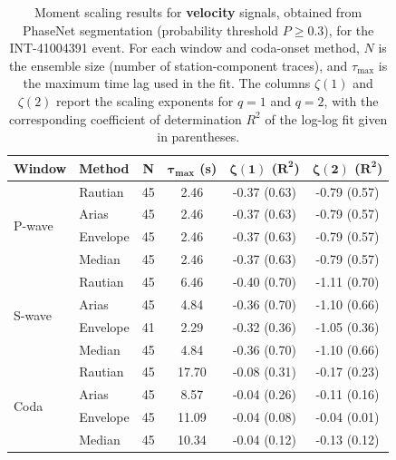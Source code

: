 \begin{table}[H]
\centering
\small
\begin{tabular}{llcccc}
\toprule
\textbf{Window} & \textbf{Method} & \textbf{N} & $\bm{\tau_{\max}}$ \textbf{(s)} & $\bm{\zeta(1)}$ \textbf{(}$\bm{R^2}$\textbf{)} & $\bm{\zeta(2)}$ \textbf{(}$\bm{R^2}$\textbf{)} \\
\midrule
\multirow{4}{*}{P-wave}
& Rautian & 45 & 2.46 & -0.37 (0.63) & -0.79 (0.57) \\
& Arias & 45 & 2.46 & -0.37 (0.63) & -0.79 (0.57) \\
& Envelope & 45 & 2.46 & -0.37 (0.63) & -0.79 (0.57) \\
& Median & 45 & 2.46 & -0.37 (0.63) & -0.79 (0.57) \\
\midrule
\multirow{4}{*}{S-wave}
& Rautian & 45 & 6.46 & -0.40 (0.70) & -1.11 (0.70) \\
& Arias & 45 & 4.84 & -0.36 (0.70) & -1.10 (0.66) \\
& Envelope & 41 & 2.29 & -0.32 (0.36) & -1.05 (0.36) \\
& Median & 45 & 4.84 & -0.36 (0.70) & -1.10 (0.66) \\
\midrule
\multirow{4}{*}{Coda}
& Rautian & 45 & 17.70 & -0.08 (0.31) & -0.17 (0.23) \\
& Arias & 45 & 8.57 & -0.04 (0.26) & -0.11 (0.16) \\
& Envelope & 45 & 11.09 & -0.04 (0.08) & -0.04 (0.01) \\
& Median & 45 & 10.34 & -0.04 (0.12) & -0.13 (0.12) \\
\bottomrule
\end{tabular}
\caption{Moment scaling results for \textbf{velocity} signals, obtained from PhaseNet segmentation (probability threshold $P \geq 0.3$), for the INT-41004391 event. For each window and coda-onset method, $N$ is the ensemble size (number of station-component traces), and $\tau_{\max}$ is the maximum time lag used in the fit. The columns $\zeta(1)$ and $\zeta(2)$ report the scaling exponents for $q=1$ and $q=2$, with the corresponding coefficient of determination $R^2$ of the log-log fit given in parentheses.}
\label{tab:phasenet_scaling_vel_thresh30_queyras}
\end{table}